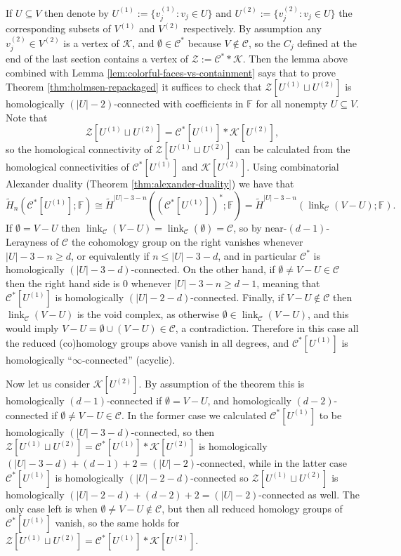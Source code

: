 \documentclass[a4paper,11pt,reqno, english]{amsart}
\theoremstyle{definition}
\theoremstyle{remark}
\DeclareMathOperator{\link}{\mathrm{link}}
\begin{document}
If $U\subseteq V$ then denote by $U^{(1)}:=\{v_j^{(1)}:v_j\in U\}$ and $U^{(2)}:=\{v_j^{(2)}:v_j\in U\}$  the corresponding subsets of $V^{(1)}$ and $V^{(2)}$ respectively. By assumption any $v_j^{(2)}\in V^{(2)}$ is a vertex of $\mathscr{K}$, and $\emptyset\in\mathscr{C}^*$ because $V\notin\mathscr{C}$, so the $C_j$ defined at the end of the last section contains a vertex of $\mathscr{Z}:=\mathscr{C}^**\mathscr{K}$. Then the lemma above combined with Lemma \ref{lem:colorful-faces-vs-containment} says that to prove Theorem \ref{thm:holmsen-repackaged} it suffices to check that $\mathscr{Z}[U^{(1)}\sqcup U^{(2)}]$ is homologically $(|U|-2)$-connected with coefficients in $\mathbb{F}$ for all nonempty $U\subseteq V$. Note that 
\[
    \mathscr{Z}[U^{(1)}\sqcup U^{(2)}]=\mathscr{C}^*[U^{(1)}]*\mathscr{K}[U^{(2)}],
\]
so the homological connectivity of $\mathscr{Z}[U^{(1)}\sqcup U^{(2)}]$ can be calculated from the homological connectivities of $\mathscr{C}^*[U^{(1)}]$ and $\mathscr{K}[U^{(2)}]$. Using combinatorial Alexander duality (Theorem \ref{thm:alexander-duality}) we have that
\[
    \tilde{H}_n(\mathscr{C}^*[U^{(1)}];\mathbb{F})\cong\tilde{H}^{|U|-3-n}((\mathscr{C}^*[U^{(1)}])^*;\mathbb{F})=\tilde{H}^{|U|-3-n}(\link_\mathscr{C}(V-U);\mathbb{F}).
\]
If $\emptyset=V-U$ then $\link_\mathscr{C}(V-U)=\link_\mathscr{C}(\emptyset)=\mathscr{C}$, so by near-$(d-1)$-Lerayness of $\mathscr{C}$ the cohomology group on the right vanishes whenever $|U|-3-n\geq d$, or equivalently if $n\leq |U|-3-d$, and in particular $\mathscr{C}^*$ is homologically $(|U|-3-d)$-connected. On the other hand, if $\emptyset\neq V-U\in\mathscr{C}$ then the right hand side is $0$ whenever $|U|-3-n\geq d-1$, meaning that $\mathscr{C}^*[U^{(1)}]$ is homologically $(|U|-2-d)$-connected. Finally, if $V-U\notin\mathscr{C}$ then $\link_\mathscr{C}(V-U)$ is the void complex, as otherwise $\emptyset\in\link_\mathscr{C}(V-U)$, and this would imply $V-U=\emptyset\cup(V-U)\in\mathscr{C}$, a contradiction. Therefore in this case all the reduced (co)homology groups above vanish in all degrees, and $\mathscr{C}^*[U^{(1)}]$ is homologically ``$\infty$-connected'' (acyclic).

Now let us consider $\mathscr{K}[U^{(2)}]$. By assumption of the theorem this is homologically $(d-1)$-connected if $\emptyset=V-U$, and homologically $(d-2)$-connected if $\emptyset\neq V-U\in\mathscr{C}$. In the former case we calculated $\mathscr{C}^*[U^{(1)}]$ to be homologically $(|U|-3-d)$-connected, so then $\mathscr{Z}[U^{(1)}\sqcup U^{(2)}]=\mathscr{C}^*[U^{(1)}]*\mathscr{K}[U^{(2)}]$ is homologically $(|U|-3-d)+(d-1)+2=(|U|-2)$-connected, while in the latter case $\mathscr{C}^*[U^{(1)}]$ is homologically $(|U|-2-d)$-connected so $\mathscr{Z}[U^{(1)}\sqcup U^{(2)}]$ is homologically $(|U|-2-d)+(d-2)+2=(|U|-2)$-connected as well. The only case left is when $\emptyset\neq V-U\not\in\mathscr{C}$, but then all reduced homology groups of $\mathscr{C}^*[U^{(1)}]$ vanish, so the same holds for $\mathscr{Z}[U^{(1)}\sqcup U^{(2)}]=\mathscr{C}^*[U^{(1)}]*\mathscr{K}[U^{(2)}]$.
\end{document}
